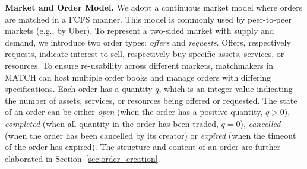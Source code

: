 \textbf{Market and Order Model.}
We adopt a continuous market model where orders are matched in a FCFS manner.
This model is commonly used by peer-to-peer markets (e.g., by Uber).
To represent a two-sided market with supply and demand, we introduce two order types: \emph{offers} and \emph{requests}.
Offers, respectively requests, indicate interest to sell, respectively buy specific assets, services, or resources.
To ensure re-usability across different markets, matchmakers in MATCH can host multiple order books and manage orders with differing specifications.
Each order has a quantity $ q $, which is an integer value indicating the number of assets, services, or resources being offered or requested.
The state of an order can be either \emph{open} (when the order has a positive quantity, $ q > 0 $), \emph{completed} (when all quantity in the order has been traded, $ q = 0 $), \emph{cancelled} (when the order has been cancelled by its creator) or \emph{expired} (when the timeout of the order has expired).
The structure and content of an order are further elaborated in Section~\ref{sec:order_creation}.

